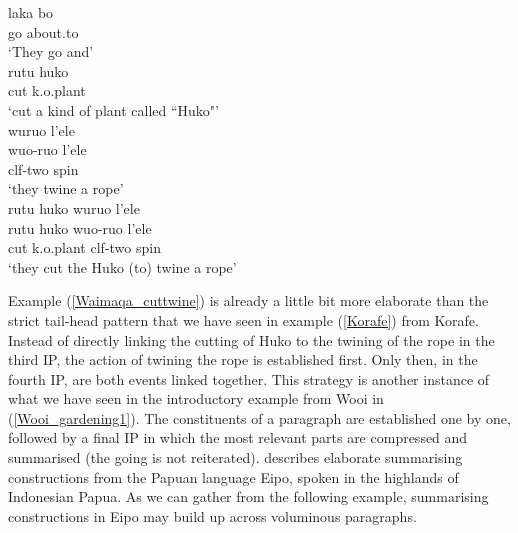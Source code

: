 \pex \label{Waimaqa_cuttwine}
\a
\gll laka bo \\
go about.to \\
\glft `They go and' \\
\z
\a
\gll rutu huko \\
cut k.o.plant \\
\glft `cut a kind of plant called ``Huko"' \\
\z
\a
\gll wuruo l'ele \\
wuo-ruo l'ele \\
\glc \acs{clf}-two spin \\
\glft `they twine a rope' \\
\z
\a
\gll rutu huko wuruo l'ele \\
rutu huko wuo-ruo l'ele \\
\glc cut k.o.plant \acs{clf}-two spin \\
\glft `they cut the Huko (to) twine a rope' \\
\z
\xe

Example (\ref{Waimaqa_cuttwine}) is already a little bit more elaborate than the strict tail-head pattern that we have seen in example (\ref{Korafe}) from Korafe. Instead of directly linking the cutting of Huko to the twining of the rope in the third IP, the action of twining the rope is established first. Only then, in the fourth IP, are both events linked together. This strategy is another instance of what we have seen in the introductory example from Wooi in (\ref{Wooi_gardening1}). The constituents of a paragraph are established one by one, followed by a final IP in which the most relevant parts are compressed and summarised (the going is not reiterated). \textcite{heeschen1998eipo} describes elaborate summarising constructions from the Papuan language Eipo, spoken in the highlands of Indonesian Papua. As we can gather from the following example, summarising constructions in Eipo may build up across voluminous paragraphs.

